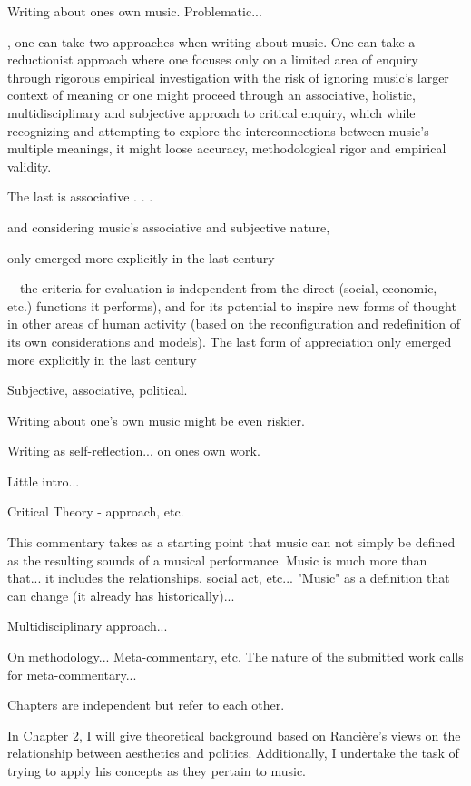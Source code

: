 Writing about ones own music. Problematic...

, one can take two approaches when writing about music. One can take a reductionist approach where one focuses only on a limited area of enquiry through rigorous empirical investigation with the risk of ignoring music's larger context of meaning or one might proceed through an associative, holistic, multidisciplinary and subjective approach to critical enquiry, which while recognizing and attempting to explore the interconnections between music's multiple meanings, it might loose accuracy, methodological rigor and empirical validity.


The last is associative . . .

and considering music's associative and subjective nature,

 only emerged more explicitly in the last century

---the criteria for evaluation is independent from the direct (social, economic, etc.) functions it performs), and for its potential to inspire new forms of thought in other areas of human activity (based on the reconfiguration and redefinition of its own considerations and models). The last form of appreciation only emerged more explicitly in the last century

Subjective, associative, political.




Writing about one's own music might be even riskier.

Writing as self-reflection... on ones own work.

Little intro... 

Critical Theory - approach, etc.

This commentary takes as a starting point that music can not simply be defined as the resulting sounds of a musical performance. Music is much more than that... it includes the relationships, social act, etc... "Music" as a definition that can change (it already has historically)...

Multidisciplinary approach...

On methodology... Meta-commentary, etc. The nature of the submitted work calls for meta-commentary...

Chapters are independent but refer to each other.

In \hyperlink{chapter2}{Chapter 2}, I will give theoretical background based on Ranci\`{e}re's views on the relationship between aesthetics and politics. Additionally, I undertake the task of trying to apply his concepts as they pertain to music. 

